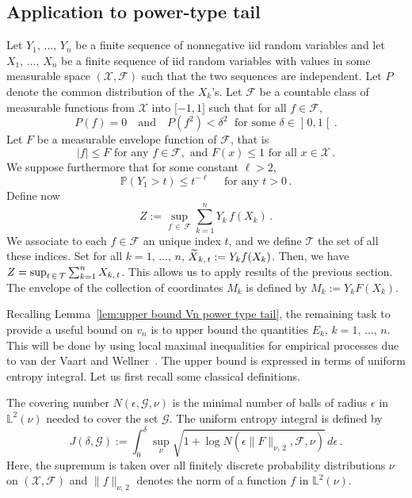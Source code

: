 \documentclass[AHL,Unicode,longabstracts,published]{cedram}
\newcommand{\bL}{\mathbb{L}}
\newcommand{\bP}{\mathbb{P}}
\newcommand{\cF}{\mathcal{F}}
\newcommand{\cT}{\mathcal{T}}
\newcommand{\cX}{\mathcal{X}}
\newcommand{\caF}{\mathscr{F}}
\newcommand{\caG}{\mathscr{G}}
\newcommand{\intervalleoo}[2]{\mathopen{]} #1\mathclose{}\mathpunct{},#2\mathclose{[}}
\newcommand{\intervalleff}[2]{\mathopen{[} #1\mathclose{}\mathpunct{},#2\mathclose{]}}
\let\oldtilde\tilde
\renewcommand*{\tilde}[1]{\mathchoice{\widetilde{#1}}{\widetilde{#1}}{\oldtilde{#1}}{\oldtilde{#1}}}
\begin{document}
\subsection{Application to power-type tail}
Let $Y_1,\,\ldots,\,Y_n$ be a finite sequence of nonnegative iid random variables and let $X_1,\,\ldots,\,X_n$ be a finite sequence of iid random variables with values in some measurable space $(\cX,\cF)$ such that the two sequences are independent. Let $P$ denote the common distribution of the $X_k$'s. Let $\caF$ be a countable class of measurable functions from $\cX$ into $\intervalleff{-1}{1}$ such that for all $f\in\caF$,
\begin{equation}\label{eqn:prop caF power type tail}
P(f)=0\quad \text{and}\quad P(f^2)< \delta^2\;\text{ for some }\delta\in \intervalleoo 01\,.
\end{equation}
Let $F$ be a measurable envelope function of $\caF$, that is
\begin{equation}\label{eqn:def envelope power type tail}
|f|\leq F\text{ for any }f\in\caF,\text{ and } F(x)\leq 1\text{ for all }x\in\cX\,.
\end{equation}
We suppose furthermore that for some constant $\ell>2$,
\begin{equation}\label{eqn:hyp envelope power type tail}
\bP(Y_1>t)\leq t^{-\ell}\quad\text{ for any }t>0\,.
\end{equation}
Define now
\begin{equation}\label{eqn:def Z power type tail}
Z:= \sup_{f\,\in\,\caF}\sum_{k=1}^nY_k\,f(X_k)\,.
\end{equation}
We associate to each $f\in\caF$ an unique index $t$, and we define $\cT$ the set of all these indices. Set for all $k=1,\,\ldots,\,n$, $\tilde X_{k,\,t}:=Y_kf(X_k)$. Then, we have $Z=\sup_{t\,\in\,\cT}\linebreak\sum_{k=1}^n X_{k,\,t}$. This allows us to apply results of the previous section. The envelope of the collection of coordinates $M_k$ is defined by $M_k:=Y_kF(X_k)$.

Recalling Lemma~\ref{lem:upper bound Vn power type tail}, the remaining task to provide a useful bound on $v_n$ is to upper bound the quantities $E_k$, $k=1,\,\ldots,\,n$. This will be done by using local maximal inequalities for empirical processes due to van der Vaart and Wellner~\cite[Theorem~2.1]{vdVW11}. The upper bound is expressed in terms of uniform entropy integral. Let us first recall some classical definitions.

\begin{defi}
The covering number $N(\epsilon,\caG, \nu)$ is the minimal number of balls of radius $\epsilon$ in $\bL^2(\nu)$ needed to cover the set $\caG$. The uniform entropy integral is defined by
\[
J(\delta,\caG):=\int_0^\delta\sup_\nu\sqrt{1+\log N\left(\epsilon\|F\|_{\nu,\,2},\caF, \nu\right)}\,d\epsilon\,.
\]
Here, the supremum is taken over all finitely discrete probability distributions $\nu$ on $(\cX,\cF)$ and $\|f\|_{\nu,\,2}$ denotes the norm of a function $f$ in $\bL^2(\nu)$.
\end{defi}
\end{document}
